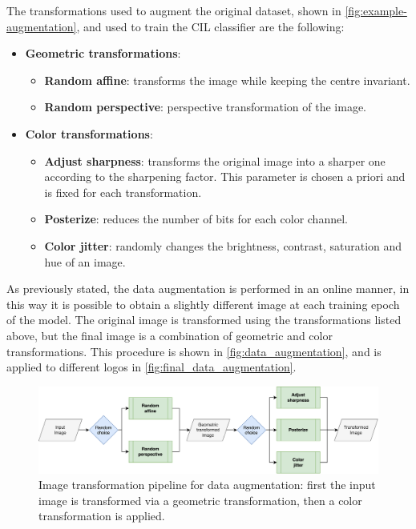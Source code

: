 The transformations used to augment the original dataset, shown in \autoref{fig:example-augmentation}, and used to train the CIL classifier are the following:
\begin{itemize}
    \item \textbf{Geometric transformations}:
    \begin{itemize}
        \item \textbf{Random affine}: transforms the image while keeping the centre invariant.
        \item \textbf{Random perspective}: perspective transformation of the image.
    \end{itemize}
    \item \textbf{Color transformations}:
    \begin{itemize}
        \item \textbf{Adjust sharpness}: transforms the original image into a sharper one according to the sharpening factor. This parameter is chosen a priori and is fixed for each transformation.
        \item \textbf{Posterize}: reduces the number of bits for each color channel.
        \item \textbf{Color jitter}: randomly changes the brightness, contrast, saturation and hue of an image.
    \end{itemize}
\end{itemize}

As previously stated, the data augmentation is performed in an online manner, in this way it is possible to obtain a slightly different image at each training epoch of the model.
The original image is transformed using the transformations listed above, but the final image is a combination of geometric and color transformations. 
This procedure is shown in \autoref{fig:data_augmentation}, and is applied to different logos in \autoref{fig:final_data_augmentation}.

\begin{figure}[H]
	\centering

    \begin{center}
        \includegraphics[width=\columnwidth]{images/data_augmentation.drawio.png}
    \end{center}

	\caption{Image transformation pipeline for data augmentation: first the input image is transformed via a geometric transformation, then a color transformation is applied.}%
	\label{fig:data_augmentation}%
\end{figure}

